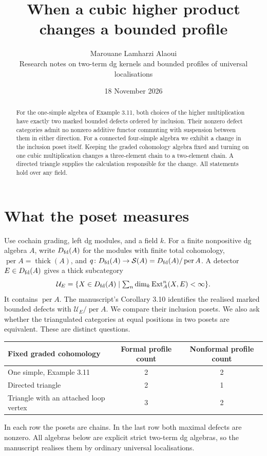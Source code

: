 \documentclass[11pt]{article}
\title{When a cubic higher product changes a bounded profile}
\author{Marouane Lamharzi Alaoui\\
\small Research notes on two-term dg kernels and bounded profiles of universal localisations}
\date{18 November 2026}
\newcommand{\Dfd}{D_{\rm fd}}
\newcommand{\per}{\operatorname{per}}
\newcommand{\thick}{\operatorname{thick}}
\newcommand{\Ext}{\operatorname{Ext}}
\newcommand{\sg}{\mathcal S}
\newcommand{\UU}{\mathcal U}
\begin{document}
\maketitle
\begin{abstract}
For the one-simple algebra of Example 3.11, both choices of the higher
multiplication have exactly two marked bounded defects ordered by inclusion.
Their nonzero defect categories admit no nonzero additive functor commuting
with suspension between them in either direction. For a connected
four-simple algebra we exhibit a change in the inclusion poset itself.
Keeping the graded cohomology algebra fixed and turning on one cubic
multiplication changes a three-element chain to a two-element chain.
A directed triangle supplies the calculation responsible for the change.
All statements hold over any field.
\end{abstract}

\section{What the poset measures}
Use cochain grading, left dg modules, and a field $k$. For a finite
nonpositive dg algebra $A$, write $\Dfd(A)$ for the modules with finite total
cohomology, $\per A=\thick(A)$, and $q\colon\Dfd(A)\to
\sg(A)=\Dfd(A)/\per A$. A detector $E\in\Dfd(A)$ gives a thick subcategory
\[
 \UU_E=\{X\in\Dfd(A)\mid \textstyle\sum_n\dim_k\Ext_A^n(X,E)<\infty\}.
\]
It contains $\per A$. The manuscript's Corollary 3.10 identifies the
realised marked bounded defects with $\UU_E/\per A$. We compare their
inclusion posets. We also ask whether the triangulated categories at equal
positions in two posets are equivalent. These are distinct questions.

\begin{center}
\begin{tabular}{lcc}
\toprule
Fixed graded cohomology & Formal profile count & Nonformal profile count\\
\midrule
One simple, Example 3.11 & 2 & 2\\
Directed triangle & 2 & 1\\
Triangle with an attached loop vertex & 3 & 2\\
\bottomrule
\end{tabular}
\end{center}
In each row the posets are chains. In the last row both maximal defects
are nonzero. All algebras below are explicit strict two-term dg algebras,
so the manuscript realises them by ordinary universal localisations.
\end{document}
